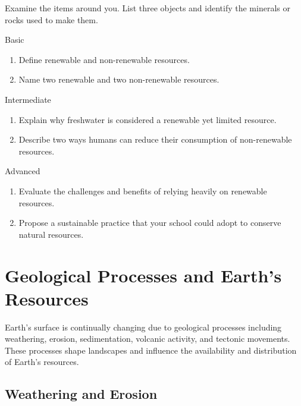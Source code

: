 \begin{stopandthink}
Examine the items around you. List three objects and identify the minerals or rocks used to make them.
\end{stopandthink}

\begin{tieredquestions}{Basic}
\begin{enumerate}
\item Define renewable and non-renewable resources.
\item Name two renewable and two non-renewable resources.
\end{enumerate}
\end{tieredquestions}

\begin{tieredquestions}{Intermediate}
\begin{enumerate}
\item Explain why freshwater is considered a renewable yet limited resource.
\item Describe two ways humans can reduce their consumption of non-renewable resources.
\end{enumerate}
\end{tieredquestions}

\begin{tieredquestions}{Advanced}
\begin{enumerate}
\item Evaluate the challenges and benefits of relying heavily on renewable resources.
\item Propose a sustainable practice that your school could adopt to conserve natural resources.
\end{enumerate}
\end{tieredquestions}

\section{Geological Processes and Earth's Resources}

Earth's surface is continually changing due to geological processes including weathering, erosion, sedimentation, volcanic activity, and tectonic movements. These processes shape landscapes and influence the availability and distribution of Earth's resources.

\subsection{Weathering and Erosion}

